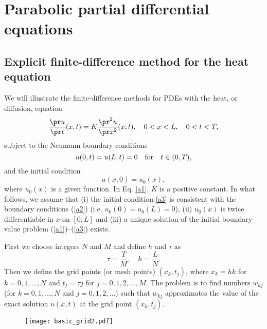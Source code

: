 %
%
%


\section{Parabolic partial differential equations}

\subsection{Explicit finite-difference method for the heat equation}
 
We will illustrate the finite-difference
methods for  PDEs with the heat, or diffusion, equation
\begin{equation}\label{a1}
\frac{\pr u}{\pr t}(x,t) = K\frac{\pr^{2} u}{\pr x^{2}}(x,t), \quad
0<x< L, \quad 0 < t < T,
\end{equation}
subject to the Neumann boundary conditions
\begin{equation}\label{a2}
u(0, t) = u(L, t)=0 \quad \hbox{for} \quad t\in (0,T),
\end{equation}
and the initial condition
\begin{equation}\label{a3}
u(x, 0) = u_{0}(x),
\end{equation}
where $u_{0}(x)$ is a given function. In Eq. \eqref{a1}, $K$ is a positive
constant.
In what follows, we assume that (i) the initial condition \eqref{a3} is consistent with
the boundary conditions (\ref{a2}) (i.e. $u_{0}(0)=u_{0}(L)=0$), (ii) $u_{0}(x)$ is twice differentiable in $x$ on $[0,L]$ and (iii) a unique solution of the initial boundary-value problem (\ref{a1})--(\ref{a3}) exists.
 
First we choose integers $N$ and $M$ and define
$h$ and $\tau$ as
\[
\tau=\frac{T}{M}, \quad h=\frac{L}{N}.
\]
Then we define the grid points (or mesh points)
$(x_{k}, t_{j})$, where $x_{k}=hk$ for $k=0,1,\dots,N$ and
$t_{j}=\tau j$ for $j=0,1,2,\dots,M$. The problem is to find numbers $w_{kj}$
(for $k=0,1,\dots,N$ and $j=0,1,2,\dots$) such that $w_{kj}$ approximates the value of the exact solution
$u(x,t)$ at the grid point $(x_{k}, t_{j})$.
\begin{figure}[h]
\centering
\texttt{[image: basic\_grid2.pdf]}
\caption{}
\end{figure}
 
